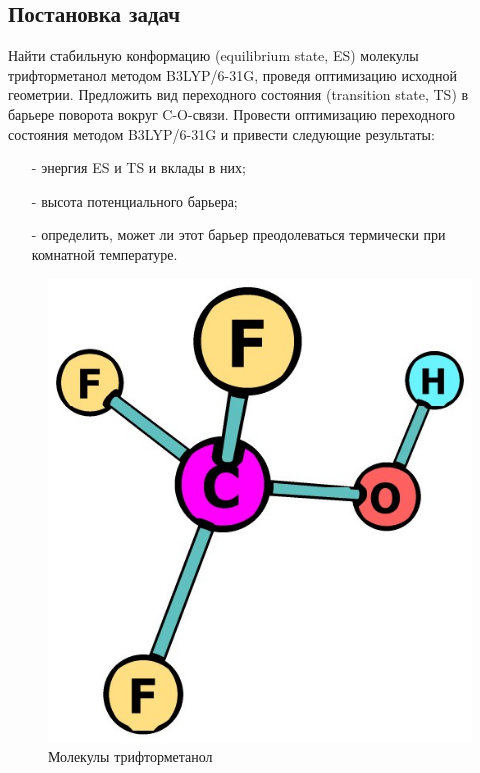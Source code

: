 \subsection{Постановка задач}
Найти стабильную конформацию (equilibrium state, ES) молекулы трифторметанол методом B3LYP/6-31G, проведя оптимизацию исходной геометрии. Предложить вид переходного состояния (transition state, TS) в барьере поворота вокруг C-O-связи. Провести оптимизацию переходного состояния методом B3LYP/6-31G и привести следующие результаты:
\begin{itemize}
    \item[-] энергия ES и TS и вклады в них;
    \item[-] высота потенциального барьера;
    \item[-] определить, может ли этот барьер преодолеваться термически при комнатной температуре.
\end{itemize}

\begin{figure}[H]
\centering
\captionsetup{justification=centering}
\includegraphics[scale=0.4]{fig/0.jpg}
\caption{Молекулы трифторметанол}
\end{figure}